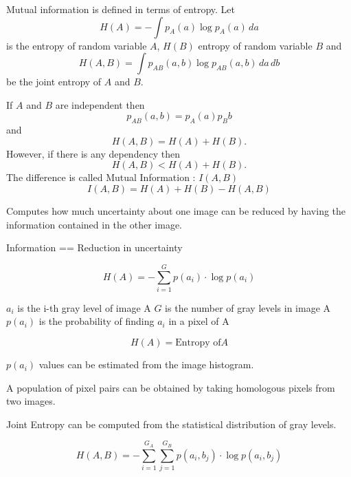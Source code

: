 Mutual information is defined in terms of entropy. Let
\begin{equation}
H(A) = - \int p_A(a) \log p_A(a)\, da
\end{equation}
is the entropy of random variable $A$, $H(B)$ entropy of 
random variable $B$ and 
\begin{equation}
H(A,B) = \int p_{AB}(a,b) \log p_{AB}(a,b)\,da\,db
\end{equation}
be the joint entropy of $A$ and $B$.

If $A$ and $B$ are independent then
\begin{equation}
p_{AB}(a,b) = p_A(a) p_B{b}
\end{equation}
and
\begin{equation}
H(A,B) = H(A) + H(B).
\end{equation}
However, if there is any dependency then
\begin{equation}
H(A,B)<H(A)+H(B).
\end{equation}
The difference is called Mutual Information : \( I(A,B) \)
\begin{equation}
I(A,B)=H(A)+H(B)-H(A,B)
\end{equation}


Computes how much uncertainty about one image can be
reduced by having the information contained in the other
image.

Information == Reduction in uncertainty

\begin{equation}
H(A)=-\sum _{i=1}^{G}p(a_{i})\cdot \log p(a_{i})
\end{equation}

\begin{center}
$a_{i}$ is the i-th gray level of image A
$G$ is the number of gray levels in image A
$p(a_{i})$ is the probability of finding $a_{i}$ in a pixel of A
\end{center}

\begin{equation}
H(A) = \mbox{Entropy of} A
\end{equation}

$p(a_{i})$ values can be estimated from the image histogram.

A population of pixel pairs can be obtained by taking homologous pixels from
two images.

Joint Entropy can be computed from the statistical distribution of gray levels.

\begin{equation}
H(A,B)=-\sum _{i=1}^{G_{A}}\sum _{j=1}^{G_{B}}p\left( a_{i},b_{j}\right) \cdot \log p\left( a_{i},b_{j}\right)
\end{equation}


